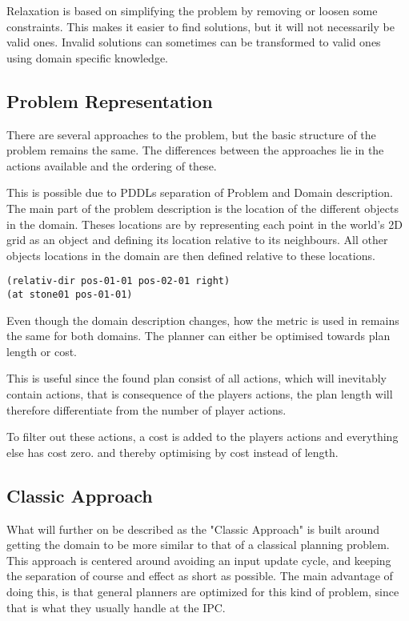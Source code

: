 	Relaxation is based on simplifying the problem by removing or loosen some constraints. This makes it easier to find solutions, but it will not necessarily be valid ones. Invalid solutions can sometimes can be transformed to valid ones using domain specific knowledge.
	
	\subsection{Problem Representation}
		There are several approaches to the problem, but the basic structure of the problem remains the same. The differences between the approaches lie in the actions available and the ordering of these. 


		This is possible due to PDDLs separation of Problem and Domain description. The main part of the problem description is the location of the different objects in the domain. Theses locations are by representing each point in the world's 2D grid as an object and defining its location relative to its neighbours. All other objects locations in the domain are then defined relative to these locations.
		\begin{lstlisting}
(relativ-dir pos-01-01 pos-02-01 right)
(at stone01 pos-01-01)
		\end{lstlisting}
		

		
		Even though the domain description changes, how the metric is used in remains the same for both domains. The planner can either be optimised towards plan length or cost. 

		This is useful since the found plan consist of all actions, which will inevitably contain actions, that is consequence of the players actions, the plan length will therefore differentiate from the number of player actions. 


		To filter out these actions, a cost is added to the players actions and everything else has cost zero. 
		and thereby optimising by cost instead of length.
	
		
		\subsection{Classic Approach}
		What will further on be described as the "Classic Approach" is built around getting the domain to be more similar to that of a classical planning problem. 
		This approach is centered around avoiding an input update cycle, and keeping the separation of course and effect as short as possible. The main advantage of doing this, is that general planners are optimized for this kind of problem, since that is what they usually handle at the IPC.
		
